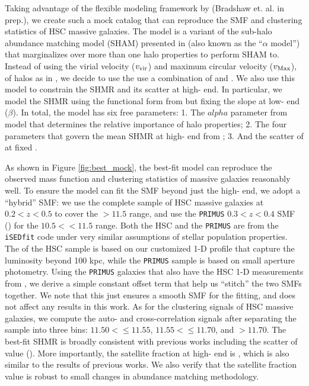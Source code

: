 \documentclass[fleqn,usenatbib,useAMS,english]{mnras}
\begin{document}
    Taking advantage of the flexible modeling framework by (Bradshaw et. al. in prep.), we
    create such a mock catalog that can reproduce the SMF and clustering statistics of HSC massive
    galaxies.
    The model is a variant of the sub-halo abundance matching model (SHAM) presented in
    \citet{Lehmann2017} (also known as the ``$\alpha$ model'') that marginalizes over more than
    one halo properties to perform SHAM to.
    Instead of using the virial velocity ($v_{\rm vir}$) and maximum circular velocity ($v_{\rm Max}$),
    of halos as in \citet{Lehmann2017}, we decide to use the use a combination of  and
    .
    We also use this model to constrain the SHMR and its scatter at high-\mhalo{} end.
    In particular, we model the SHMR using the functional form from \citet{Behroozi2013} but
    fixing the slope at low-\mhalo{} end ($\beta$).
    In total, the model has six free parameters:
    1. The $alpha$ parameter from \citet{Lehmann2017} model that determines the relative
       importance of halo properties;
    2. The four parameters that govern the mean SHMR at high-\mhalo{} end from \citet{Behroozi2013};
    3. And the scatter of \mstar{} at fixed \mhalo{}.

    As shown in Figure \ref{fig:best_mock}, the best-fit model can reproduce the observed
    mass function and clustering statistics of massive galaxies reasonably well.
    To ensure the model can fit the SMF beyond just the high-\mstar{} end, we adopt a ``hybrid''
    SMF: we use the complete sample of HSC massive galaxies at $0.2 < z < 0.5$ to cover the
    \logms{}$>11.5$ range, and use the \texttt{PRIMUS} $0.3 < z < 0.4$ SMF
    (\citealt{Moustakas2013}) for the $10.5 <$\logms{}$<11.5$ range.
    Both the HSC and the \texttt{PRIMUS} \mstar{} are from the \texttt{iSEDfit} code under very
    similar assumptions of stellar population properties.
    The \mstar{} of the HSC sample is based on our customized 1-D profile that capture the
    luminosity beyond 100 kpc, while the \texttt{PRIMUS} sample is based on small aperture
    photometry.
    Using the \texttt{PRIMUS} galaxies that also have the HSC 1-D \mstar{} measurements from
    \citet{Huang2018b}, we derive a simple constant offset term that help us ``stitch'' the two
    SMFs together.
    We note that this just ensures a smooth SMF for the fitting, and does not affect any results
    in this work.
    As for the clustering signals of HSC massive galaxies, we compute the auto- and
    cross-correlation signals after separating the sample into three \mstar{} bins: $11.50
    <$\logms{}$\leq 11.55$, $11.55 <$\logms{}$\leq 11.70$, and \logms{}$> 11.70$.
    The best-fit SHMR is broadly consistent with previous works including the scatter of
    \mstar{} value ().
    More importantly, the satellite fraction at high-\mstar{} end is , which is also
    similar to the results of previous works.
    We also verify that the satellite fraction value is robust to small changes in abundance
    matching methodology.
\end{document}
